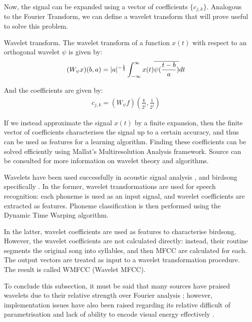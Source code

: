 \documentclass[../main.tex]{subfiles}
\begin{document}
\par Now, the signal can be expanded using a vector of coefficients $\{c_{j,k}\}$. Analogous to the Fourier Transform, we can define a wavelet transform \cite{Weisstein2015a} that will prove useful to solve this problem.
\begin{definition}{Wavelet transform.} \label{def_wtransform} The wavelet transform of a function $x(t)$ with respect to an orthogonal wavelet $\psi$ is given by:
\begin{align*}
(W_\psi x)(b, a) = \lvert a\rvert^{-\frac{1}{2}}\int_{-\infty}^\infty x(t)\overline{\psi(\frac{t-b}{a})}dt
\end{align*}
\end{definition}
\par And the coefficients are given by:
\begin{align*}
c_{j,k} = (W_\psi f)(\frac{k}{2^j}, \frac{1}{2^j})
\end{align*}
\par If we instead approximate the signal $x(t)$ by a finite expansion, then the finite vector of coefficients characterises the signal up to a certain accuracy, and thus can be used as features for a learning algorithm. Finding these coefficients can be solved efficiently using Mallat's Multiresolution Analysis framework. Source \cite{Vidakovic1991} can be consulted for more information on wavelet theory and algorithms.
\par Wavelets have been used successfully in acoustic signal analysis \cite{Gamulkiewicz2003}, and birdsong specifically \cite{Chou2009}. In the former, wavelet transformations are used for speech recognition: each phoneme is used as an input signal, and wavelet coefficients are extracted as features. Phoneme classification is then performed using the Dynamic Time Warping algorithm. 
\par In the latter, wavelet coefficients are used as features to characterise birdsong. However, the wavelet coefficients are not calculated directly: instead, their routine segments the original song into syllables, and then MFCC are calculated for each. The output vectors are treated as input to a wavelet transformation procedure. The result is called WMFCC (Wavelet MFCC). 
\par To conclude this subsection, it must be said that many sources have praised wavelets due to their relative strength over Fourier analysis \cite{Gamulkiewicz2003,Weisstein2015a,Chui1992,Vidakovic1991}; however, implementation issues have also been raised regarding its relative difficult of parametrisation and lack of ability to encode visual energy effectively \cite{Garrett-Glaser2010}.
\end{document}
